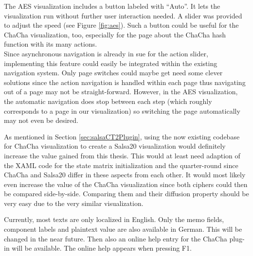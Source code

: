 \begin{description}[style=nextline]
\item[Automatic navigation]

The AES visualization includes a button labeled with ``Auto''. It lets the visualization run without further user interaction needed. A slider was provided to adjust the speed (see Figure \ref{fig:aes}). Such a button could be useful for the ChaCha visualization, too, especially for the page about the ChaCha hash function with its many actions. \\
Since asynchronous navigation is already in sue for the action slider, implementing this feature could easily be integrated within the existing navigation system. Only page switches could maybe get need some clever solutions since the action navigation is handled within each page thus navigating out of a page may not be straight-forward. However, in the AES visualization, the automatic navigation does stop between each step (which roughly corresponds to a page in our visualization) so switching the page automatically may not even be desired.

\item[Salsa20 visualization]

As mentioned in Section \ref{sec:salsaCT2Plugin}, using the now existing codebase for ChaCha visualization to create a Salsa20 visualization would definitely increase the value gained from this thesis. This would at least need adaption of the XAML code for the state matrix initialization and the quarter-round since ChaCha and Salsa20 differ in these aspects from each other. It would most likely even increase the value of the ChaCha visualization since both ciphers could then be compared side-by-side. Comparing them and their diffusion property should be very easy due to the very similar visualization.

\item[Localization and online help]

Currently, most texts are only localized in English. Only the memo fields, component labels and plaintext value are also available in German. 
This will be changed in the near future. Then also an online help entry for the ChaCha plug-in will be available. The online help appears when pressing F1.

\end{description}


